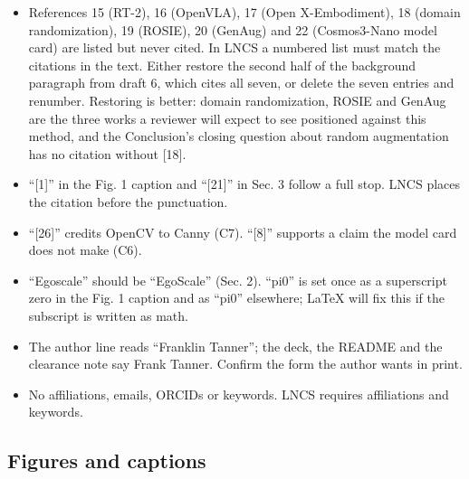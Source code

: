 \documentclass[
  11pt,
]{article}
\providecommand{\tightlist}{%
  \setlength{\itemsep}{0pt}\setlength{\parskip}{0pt}}
\begin{document}
\begin{itemize}
\tightlist
\item
  References 15 (RT-2), 16 (OpenVLA), 17 (Open X-Embodiment), 18 (domain
  randomization), 19 (ROSIE), 20 (GenAug) and 22 (Cosmos3-Nano model
  card) are listed but never cited. In LNCS a numbered list must match
  the citations in the text. Either restore the second half of the
  background paragraph from draft 6, which cites all seven, or delete
  the seven entries and renumber. Restoring is better: domain
  randomization, ROSIE and GenAug are the three works a reviewer will
  expect to see positioned against this method, and the Conclusion's
  closing question about random augmentation has no citation without
  {[}18{]}.
\item
  ``{[}1{]}'' in the Fig. 1 caption and ``{[}21{]}'' in Sec. 3 follow a
  full stop. LNCS places the citation before the punctuation.
\item
  ``{[}26{]}'' credits OpenCV to Canny (C7). ``{[}8{]}'' supports a
  claim the model card does not make (C6).
\item
  ``Egoscale'' should be ``EgoScale'' (Sec. 2). ``pi0'' is set once as a
  superscript zero in the Fig. 1 caption and as ``pi0'' elsewhere; LaTeX
  will fix this if the subscript is written as math.
\item
  The author line reads ``Franklin Tanner''; the deck, the README and
  the clearance note say Frank Tanner. Confirm the form the author wants
  in print.
\item
  No affiliations, emails, ORCIDs or keywords. LNCS requires
  affiliations and keywords.
\end{itemize}

\subsection{Figures and captions}\label{figures-and-captions}
\end{document}
